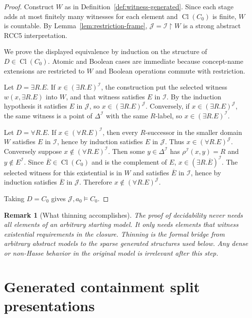 \documentclass[11pt]{article}
\newtheorem{remark}[theorem]{Remark}
\newcommand{\Cl}{\operatorname{Cl}}
\newcommand{\I}{\mathcal I}
\newcommand{\J}{\mathcal J}
\begin{document}
\begin{proof}
Construct $W$ as in Definition~\ref{def:witness-generated}.  Since each stage adds at most finitely many witnesses for each element and $\Cl(C_0)$ is finite, $W$ is countable.  By Lemma~\ref{lem:restriction-frame}, $\J=\I\upharpoonright W$ is a strong abstract RCC5 interpretation.

We prove the displayed equivalence by induction on the structure of $D\in\Cl(C_0)$.  Atomic and Boolean cases are immediate because concept-name extensions are restricted to $W$ and Boolean operations commute with restriction.

Let $D=\exists R.E$.  If $x\in(\exists R.E)^\I$, the construction put the selected witness $w(x,\exists R.E)$ into $W$, and that witness satisfies $E$ in $\I$.  By the induction hypothesis it satisfies $E$ in $\J$, so $x\in(\exists R.E)^\J$.  Conversely, if $x\in(\exists R.E)^\J$, the same witness is a point of $\Delta^\I$ with the same $R$-label, so $x\in(\exists R.E)^\I$.

Let $D=\forall R.E$.  If $x\in(\forall R.E)^\I$, then every $R$-successor in the smaller domain $W$ satisfies $E$ in $\I$, hence by induction satisfies $E$ in $\J$.  Thus $x\in(\forall R.E)^\J$.  Conversely suppose $x\notin(\forall R.E)^\I$.  Then some $y\in\Delta^\I$ has $\rho^\I(x,y)=R$ and $y\notin E^\I$.  Since $\overline E\in\Cl(C_0)$ and is the complement of $E$, $x\in(\exists R.\overline E)^\I$.  The selected witness for this existential is in $W$ and satisfies $\overline E$ in $\I$, hence by induction satisfies $\overline E$ in $\J$.  Therefore $x\notin(\forall R.E)^\J$.

Taking $D=C_0$ gives $\J,a_0\models C_0$.
\end{proof}

\begin{remark}[What thinning accomplishes]
The proof of decidability never needs all elements of an arbitrary starting model.  It only needs elements that witness existential requirements in the closure.  Thinning is the formal bridge from arbitrary abstract models to the sparse generated structures used below.  Any dense or non-Hasse behavior in the original model is irrelevant after this step.
\end{remark}

\section{Generated containment split presentations}
\end{document}
